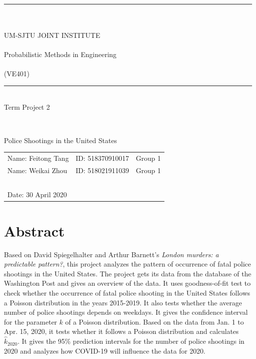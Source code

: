 \documentclass[a4paper]{article}
\begin{document}
\begin{large}
	\begin{center}
	~\\ ~\\ ~\\ ~\\ ~\\ ~\\ \rule[-1pt]{10.3cm}{0.05em} \\~\\UM-SJTU JOINT INSTITUTE\\~\\Probabilistic Methods in
Engineering\\~\\(VE401)	~\\ \rule[-1pt]{10.3cm}{0.05em} \vspace{7cm} \\Term Project 2
	\end{center}
\end{large}
~\\

\begin{large}
	\begin{center}
	Police Shootings in the United States
	\end{center}
\end{large}
\vspace{5cm}

\begin{tabular}{l l l}
	Name: Feitong Tang&ID: 518370910017&Group 1\\
	Name: Weikai Zhou&ID: 518021911039&Group 1\\
     ~\\
	Date: 30 April 2020
\end{tabular}

\newpage

\section{Abstract}
	Based on David Spiegelhalter and Arthur Barnett's \textit{London murders: a predictable pattern?}, this project analyzes the pattern of occurrence of fatal police shootings in the United States. The project gets its data from the database of the Washington Post and gives an overview of the data. It uses goodness-of-fit test to check whether the occurrence of fatal police shooting in the United States follows a Poisson distribution in the years 2015-2019. It also tests whether the average number of police shootings depends on weekdays. It gives the confidence interval for the parameter $k$ of a Poisson distribution. Based on the data from Jan. 1 to Apr. 15, 2020, it tests whether it follows a Poisson distribution and calculates $\hat{k}_{2020}$. It gives the 95\% prediction intervals for the number of police shootings in 2020 and analyzes how COVID-19 will influence the data for 2020.
\\
\end{document}
